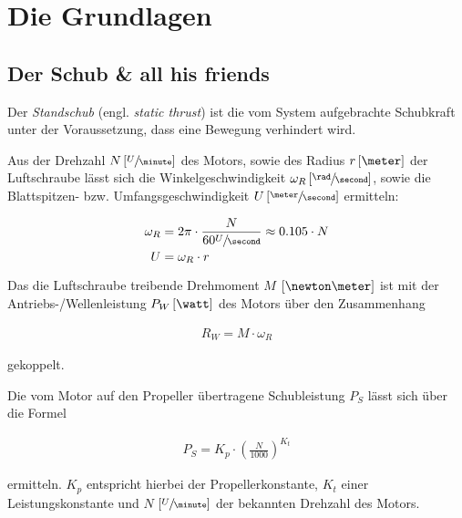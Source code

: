 \chapter{Die Grundlagen}

\section{Der Schub \& all his friends}

Der \emph{Standschub} (engl. \emph{static thrust}) ist die vom System aufgebrachte Schubkraft unter der Voraussetzung, dass eine Bewegung verhindert wird.

\bigbreak

Aus der Drehzahl $N \left[\sfrac{U}{\minute}\right]$ des Motors, sowie des Radius $r \left[\meter\right]$ der Luftschraube lässt sich die Winkelgeschwindigkeit $\omega_R \left[\sfrac{\rad}{\second}\right]$, sowie die Blattspitzen- bzw. Umfangsgeschwindigkeit $U \left[\sfrac{\meter}{\second}\right]$ ermitteln:

\begin{align}
	\omega_R &= 2\pi \cdot \frac{N}{60 \sfrac{U}{\second}} \approx 0.105 \cdot N \\
	U &= \omega_R \cdot r
\end{align}

\bigbreak

Das die Luftschraube treibende Drehmoment $M$ $\left[\newton\meter\right]$ ist mit der Antriebs-/Wellenleistung $P_W \left[\watt\right]$ des Motors über den Zusammenhang

\begin{align}
	R_W = M \cdot \omega_R
\end{align}

gekoppelt.

\bigbreak {}

Die vom Motor auf den Propeller übertragene Schubleistung $P_S$ lässt sich über die Formel

\begin{align}
	P_S = K_p \cdot \left(\frac{N}{1000}\right)^{K_t}
\end{align}

ermitteln. $K_p$ entspricht hierbei der Propellerkonstante, $K_t$ einer Leistungskonstante  und $N$ $\left[\sfrac{U}{\minute}\right]$ der bekannten Drehzahl des Motors.

